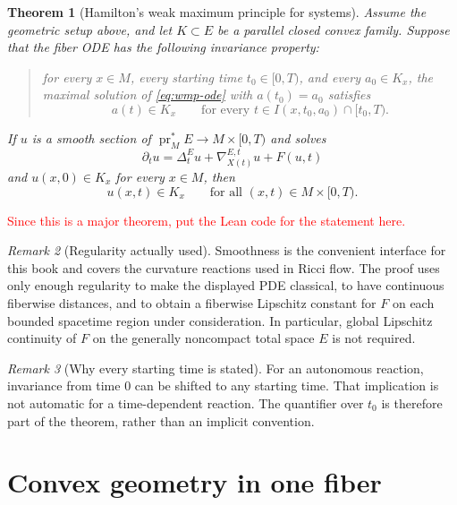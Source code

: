 \documentclass[10pt]{coll-l}
\newtheorem{theorem}{Theorem}[chapter]
\theoremstyle{definition}
\theoremstyle{remark}
\newtheorem{remark}[theorem]{Remark}
\numberwithin{section}{chapter}
\numberwithin{equation}{chapter}
\begin{document}
\begin{theorem}[Hamilton's weak maximum principle for systems]
\label{thm:hamilton-wmp-systems}
Assume the geometric setup above, and let $K\subset E$ be a parallel closed
convex family.  Suppose that the fiber ODE has the following invariance
property:
\begin{quote}
for every $x\in M$, every starting time $t_0\in[0,T)$, and every
$a_0\in K_x$, the maximal solution of \eqref{eq:wmp-ode} with
$a(t_0)=a_0$ satisfies
\[
    a(t)\in K_x
    \qquad\text{for every }
    t\in I(x,t_0,a_0)\cap[t_0,T).
\]
\end{quote}
If $u$ is a smooth section of
$\operatorname{pr}_M^*E\to M\times[0,T)$ and solves
\begin{equation}
     \partial_tu
       =\Delta_t^E u+\nabla^{E,t}_{X(t)}u+F(u,t)            \label{eq:wmp-pde}
\end{equation}
and $u(x,0)\in K_x$ for every $x\in M$, then
\[
     u(x,t)\in K_x
     \qquad\text{for all }(x,t)\in M\times[0,T).
\]
\end{theorem}

\textcolor{red}{Since this is a major theorem, put the Lean code for the statement here.}

\begin{remark}[Regularity actually used]
\label{rem:wmp-regularity}
Smoothness is the convenient interface for this book and covers the
curvature reactions used in Ricci flow.  The proof uses only enough
regularity to make the displayed PDE classical, to have continuous
fiberwise distances, and to obtain a fiberwise Lipschitz constant for $F$ on
each bounded spacetime region under consideration.  In particular, global
Lipschitz continuity of $F$ on the generally noncompact total space $E$ is
not required.
\end{remark}

\begin{remark}[Why every starting time is stated]
\label{rem:wmp-starting-time}
For an autonomous reaction, invariance from time $0$ can be shifted to any
starting time.  That implication is not automatic for a time-dependent
reaction.  The quantifier over $t_0$ is therefore part of the theorem, rather
than an implicit convention.
\end{remark}

\section{Convex geometry in one fiber}
\label{sec:wmp-convex}
\end{document}

